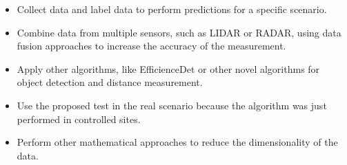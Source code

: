 \begin{itemize}
    \item Collect data and label data to perform predictions for a specific scenario.
    \item Combine data from multiple sensors, such as LIDAR or RADAR, using data fusion approaches to increase the accuracy of the measurement. 
    \item Apply other algorithms, like EfficienceDet or other novel algorithms for object detection and distance measurement.
    \item Use the proposed test in the real scenario because the algorithm was just performed in controlled sites. 
    \item Perform other mathematical approaches to reduce the dimensionality of the data.
\end{itemize}